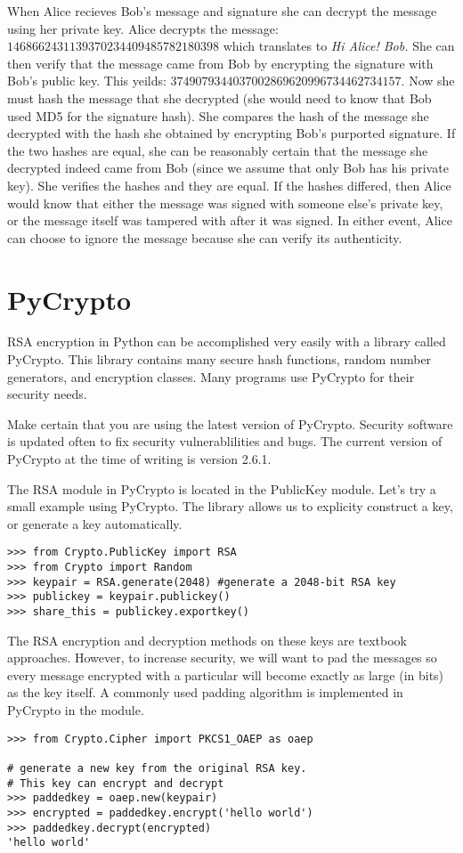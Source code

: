 When Alice recieves Bob's message and signature she can decrypt the message using her private key.
Alice decrypts the message: $1468662431139370234409485782180398$ which translates to \emph{Hi Alice! Bob.}
She can then verify that the message came from Bob by encrypting the signature with Bob's public key.
This yeilds: $3749079344037002869620996734462734157$.
Now she must hash the message that she decrypted (she would need to know that Bob used MD5 for the signature hash).
She compares the hash of the message she decrypted with the hash she obtained by encrypting Bob's purported signature.
If the two hashes are equal, she can be reasonably certain that the message she decrypted indeed came from Bob (since we assume that only Bob has his private key).
She verifies the hashes and they are equal.
If the hashes differed, then Alice would know that either the message was signed with someone else's private key, or the message itself was tampered with after it was signed.
In either event, Alice can choose to ignore the message because she can verify its authenticity.

\section{PyCrypto}
RSA encryption in Python can be accomplished very easily with a library called PyCrypto.
This library contains many secure hash functions, random number generators, and encryption classes.
Many programs use PyCrypto for their security needs.
\begin{warn}
Make certain that you are using the latest version of PyCrypto.
Security software is updated often to fix security vulnerablilities and bugs.
The current version of PyCrypto at the time of writing is version 2.6.1.
\end{warn}

The RSA module in PyCrypto is located in the PublicKey module.
Let's try a small example using PyCrypto.
The library allows us to explicity construct a key, or generate a key automatically.
\begin{lstlisting}
>>> from Crypto.PublicKey import RSA
>>> from Crypto import Random
>>> keypair = RSA.generate(2048) #generate a 2048-bit RSA key
>>> publickey = keypair.publickey()
>>> share_this = publickey.exportkey()
\end{lstlisting}

The RSA encryption and decryption methods on these keys are textbook approaches.
However, to increase security, we will want to pad the messages so every message encrypted with a particular will become exactly as large (in bits) as the key itself.
A commonly used padding algorithm is implemented in PyCrypto in the  module.
\begin{lstlisting}
>>> from Crypto.Cipher import PKCS1_OAEP as oaep

# generate a new key from the original RSA key.
# This key can encrypt and decrypt
>>> paddedkey = oaep.new(keypair)
>>> encrypted = paddedkey.encrypt('hello world')
>>> paddedkey.decrypt(encrypted)
'hello world'
\end{lstlisting}

